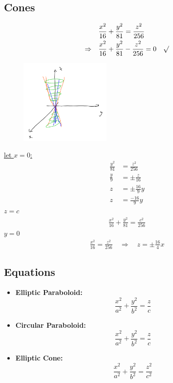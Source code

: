 \documentclass{article}
\begin{document}
\subsection{Cones}

\begin{align*}
  &\frac{x^2}{16}+\frac{y^2}{81}=\frac{z^2}{256}\\
  \Rightarrow\quad&\frac{x^2}{16}+\frac{y^2}{81}-\frac{z^2}{256}=0\quad\surd
\end{align*}
\begin{figure}[H]
  \includegraphics[width=0.4\textwidth, center]{cone1.png}
  \label{fig:cone1}
\end{figure}
\begin{flushleft}
  \underline{let $x=0$:}
  \begin{align*}
    \frac{y^2}{81}&=\frac{z^2}{256}\\
    \frac{y}{9}&=\pm\frac{z}{16}\\
    z&=\pm\frac{16}{9}y\\
    z&=\frac{-16}{9}y
  \end{align*}
  \underline{$z=c$}
  \begin{align*}
    \frac{x^2}{16}+\frac{y^2}{81}=\frac{c^2}{256}
  \end{align*}
  \underline{$y=0$}
  \begin{align*}
    \frac{x^2}{16}=\frac{z^2}{256}\quad\Rightarrow\quad z=\pm\frac{16}{4}x
  \end{align*}
\end{flushleft}

\subsection{Equations}
\begin{itemize}
  \item \textbf{Elliptic Paraboloid:}
  \[
  \frac{x^2}{a^2}+\frac{y^2}{b^2}=\frac{z}{c}
  \]
  \item \textbf{Circular Paraboloid:}
  \[
  \frac{x^2}{a^2}+\frac{y^2}{b^2}=\frac{z}{c}
  \]
  \item \textbf{Elliptic Cone:}
  \[
  \frac{x^2}{a^2}+\frac{y^2}{b^2}=\frac{z^2}{c^2}
  \]
\end{itemize}
\end{document}
